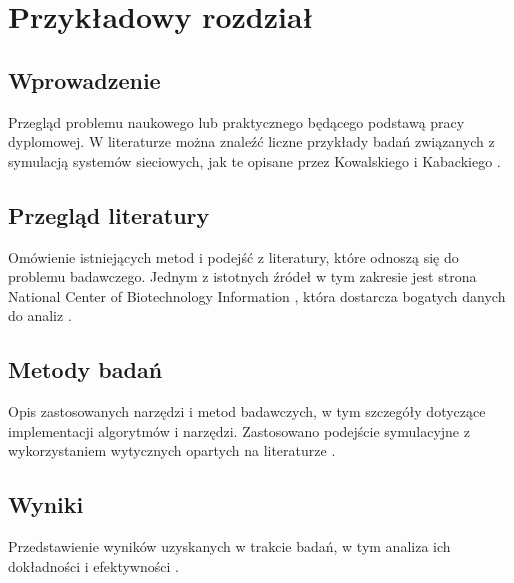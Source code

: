 \chapter{Przykładowy rozdział}

\section{Wprowadzenie}
Przegląd problemu naukowego lub praktycznego będącego podstawą pracy dyplomowej. W literaturze można znaleźć liczne przykłady badań związanych z symulacją systemów sieciowych, jak te opisane przez Kowalskiego i Kabackiego \cite{kowalski2002}.

\section{Przegląd literatury}
Omówienie istniejących metod i podejść z literatury, które odnoszą się do problemu badawczego. Jednym z istotnych źródeł w tym zakresie jest strona National Center of Biotechnology Information \cite{ncbi2022}, która dostarcza bogatych danych do analiz \cite{openai2024}.

\section{Metody badań}
Opis zastosowanych narzędzi i metod badawczych, w tym szczegóły dotyczące implementacji algorytmów i narzędzi. Zastosowano podejście symulacyjne z wykorzystaniem wytycznych opartych na literaturze \cite{kowalski2002}.

\section{Wyniki}
Przedstawienie wyników uzyskanych w trakcie badań, w tym analiza ich dokładności i efektywności \cite{openai2024}.
